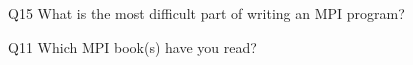 \begin{description}%
\item{Q15} What is the most difficult part of writing an MPI program?%
\item{Q11} Which MPI book(s) have you read?%
\end{description}%
